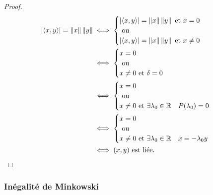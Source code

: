 \begin{proof}
  \begin{align}
    \left\lvert\left\langle{x},{y}\right\rangle\right\rvert=\left\lVert x\right\rVert\left\lVert y\right\rVert &\iff \begin{cases} \left\lvert\left\langle{x},{y}\right\rangle\right\rvert=\left\lVert x\right\rVert\left\lVert y\right\rVert \text{~et~} x=0 \\ \text{~ou~} \\
    \left\lvert\left\langle{x},{y}\right\rangle\right\rvert=\left\lVert x\right\rVert\left\lVert y\right\rVert \text{~et~} x\neq 0 \end{cases}\\
                                             &\iff \begin{cases}  x=0 \\ \text{~ou~} \\
                                             x\neq 0 \text{~et~}  \delta=0\end{cases}\\
                                             &\iff \begin{cases}  x=0 \\ \text{~ou~} \\
                                             x\neq 0 \text{~et~}  \exists \lambda_0 \in \mathbb{R} \quad P(\lambda_0)=0\end{cases}\\
                                             &\iff \begin{cases}  x=0 \\ \text{~ou~} \\
                                             x\neq 0 \text{~et~}  \exists \lambda_0 \in \mathbb{R} \quad x=-\lambda_0 y\end{cases}\\
                                             &\iff (x,y) \text{~est liée}.
    \end{align}
  \end{proof}

  \subsubsection{Inégalité de Minkowski}

